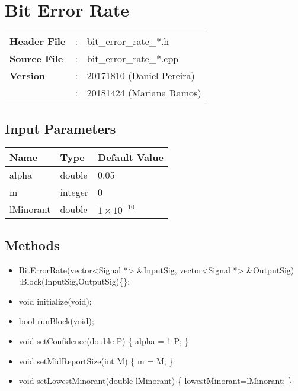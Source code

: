 \clearpage

\section{Bit Error Rate}

\begin{refsection}

\begin{tcolorbox}	
\begin{tabular}{p{2.75cm} p{0.2cm} p{10.5cm}} 	
\textbf{Header File}    &:& bit\_error\_rate\_*.h \\
\textbf{Source File}    &:& bit\_error\_rate\_*.cpp \\
\textbf{Version}        &:& 20171810 (Daniel Pereira)\\
                        &:& 20181424 (Mariana Ramos)
\end{tabular}
\end{tcolorbox}

\subsection*{Input Parameters}

\begin{table}[H]
\centering
\begin{tabular}{|l|l|l|}
\hline
Name           & Type           & Default Value     \\ \hline
alpha          & double         & 0.05              \\ \hline
m              & integer        & 0                 \\ \hline
lMinorant      & double         & $1\times10^{-10}$ \\ \hline
\end{tabular}
\end{table}


\subsection*{Methods}

\begin{itemize}
  \item BitErrorRate(vector<Signal *> \&InputSig, vector<Signal *> \&OutputSig) :Block(InputSig,OutputSig)\{\};
  \item void initialize(void);
  \item bool runBlock(void);
  \item void setConfidence(double P) \{ alpha = 1-P; \}
  \item void setMidReportSize(int M) \{ m = M; \}
  \item void setLowestMinorant(double lMinorant) \{ lowestMinorant=lMinorant; \}
\end{itemize}





\end{refsection}
